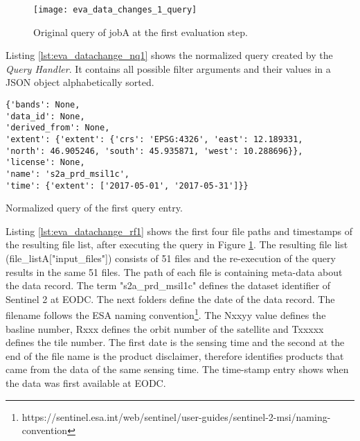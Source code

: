 \documentclass[draft,final]{vutinfth} %
\newenvironment{code}{\captionsetup{type=listing}}{}
\begin{document}
\begin{enumerate}
	\begin{figure}[h]
		\centering
		\texttt{[image: eva\_data\_changes\_1\_query]}
		\caption{Original query of jobA at the first evaluation step.}
		\label{fig:eva_data_changes_1_query} %
	\end{figure}
	
	Listing \ref{lst:eva_datachange_nq1} shows the normalized query created by the \textit{Query Handler}. It contains all possible filter arguments and their values in a JSON object alphabetically sorted.
	
	\begin{code}
		\begin{verbatim}
{'bands': None, 
'data_id': None, 
'derived_from': None, 
'extent': {'extent': {'crs': 'EPSG:4326', 'east': 12.189331, 
'north': 46.905246, 'south': 45.935871, 'west': 10.288696}}, 
'license': None, 
'name': 's2a_prd_msil1c', 
'time': {'extent': ['2017-05-01', '2017-05-31']}}
		\end{verbatim}
		\caption{Normalized query of the first query entry.}
		\label{lst:eva_datachange_nq1}
	\end{code}
	
	Listing \ref{lst:eva_datachange_rf1} shows the first four file paths and timestamps of the resulting file list, after executing the query in Figure \ref{fig:eva_data_changes_1_query}. The resulting file list (file\_listA["input\_files"]) consists of 51 files and the re-execution of the query results in the same 51 files. The path of each file is containing meta-data about the data record. The term "s2a\_prd\_msil1c" defines the dataset identifier of Sentinel 2 at EODC. The next folders define the date of the data record. The filename follows the ESA naming convention\footnote{https://sentinel.esa.int/web/sentinel/user-guides/sentinel-2-msi/naming-convention}. The Nxxyy value defines the basline number, Rxxx defines the orbit number of the satellite and Txxxxx defines the tile number. The first date is the sensing time and the second at the end of the file name is the product disclaimer, therefore identifies products that came from the data of the same sensing time. The time-stamp entry shows when the data was first available at EODC.
	

\end{enumerate}
\end{document}

